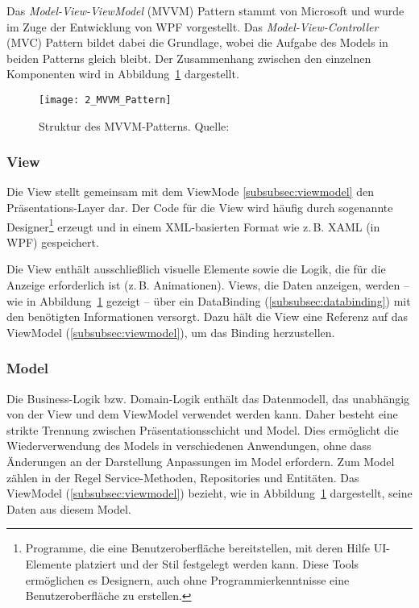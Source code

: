 Das \textit{Model-View-ViewModel} (MVVM) Pattern stammt von Microsoft \cite{Gossman2005MVVM} und wurde im Zuge der Entwicklung von WPF vorgestellt. 
Das \textit{Model-View-Controller} (MVC) Pattern \cite{Krasner1988MVC} bildet dabei die Grundlage, wobei die Aufgabe des Models in beiden Patterns gleich bleibt. 
Der Zusammenhang zwischen den einzelnen Komponenten wird in Abbildung~\ref{fig:mvvm_pattern} dargestellt.

\begin{figure}[H]
    \centering
    \texttt{[image: 2\_MVVM\_Pattern]}
    \caption{Struktur des MVVM-Patterns. Quelle: \cite{Uncopy2024MVVMPattern}}
    \label{fig:mvvm_pattern}
\end{figure}

\subsubsection{View}
\label{subsubsec:view_for_mvvm}
Die View stellt gemeinsam mit dem ViewMode \ref{subsubsec:viewmodel} den Präsentations-Layer dar. 
Der Code für die View wird häufig durch sogenannte Designer\footnote{Programme, die eine Benutzeroberfläche bereitstellen, mit deren Hilfe UI-Elemente platziert und der Stil festgelegt werden kann. 
Diese Tools ermöglichen es Designern, auch ohne Programmierkenntnisse eine Benutzeroberfläche zu erstellen.} erzeugt und in einem XML-basierten Format wie z.\,B. XAML (in WPF) gespeichert. 

Die View enthält ausschließlich visuelle Elemente sowie die Logik, die für die Anzeige erforderlich ist (z.\,B. Animationen). 
Views, die Daten anzeigen, werden – wie in Abbildung~\ref{fig:mvvm_pattern} gezeigt – über ein DataBinding (\ref{subsubsec:databinding}) mit den benötigten Informationen versorgt. 
Dazu hält die View eine Referenz auf das ViewModel (\ref{subsubsec:viewmodel}), um das Binding herzustellen.

\subsubsection{Model}
\label{subsubsec:model_for_mvvm}
Die Business-Logik bzw. Domain-Logik enthält das Datenmodell, das unabhängig von der View und dem ViewModel verwendet werden kann. 
Daher besteht eine strikte Trennung zwischen Präsentationsschicht und Model. 
Dies ermöglicht die Wiederverwendung des Models in verschiedenen Anwendungen, ohne dass Änderungen an der Darstellung Anpassungen im Model erfordern. 
Zum Model zählen in der Regel Service-Methoden, Repositories und Entitäten. 
Das ViewModel (\ref{subsubsec:viewmodel}) bezieht, wie in Abbildung~\ref{fig:mvvm_pattern} dargestellt, seine Daten aus diesem Model.

